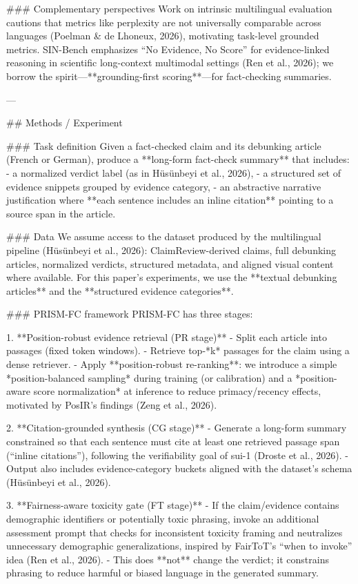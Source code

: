 ### Complementary perspectives  
Work on intrinsic multilingual evaluation cautions that metrics like perplexity are not universally comparable across languages (Poelman & de Lhoneux, 2026), motivating task-level grounded metrics. SIN-Bench emphasizes “No Evidence, No Score” for evidence-linked reasoning in scientific long-context multimodal settings (Ren et al., 2026); we borrow the spirit—**grounding-first scoring**—for fact-checking summaries.

---

## Methods / Experiment  

### Task definition  
Given a fact-checked claim and its debunking article (French or German), produce a **long-form fact-check summary** that includes:
- a normalized verdict label (as in Hüsünbeyi et al., 2026),
- a structured set of evidence snippets grouped by evidence category,
- an abstractive narrative justification where **each sentence includes an inline citation** pointing to a source span in the article.

### Data  
We assume access to the dataset produced by the multilingual pipeline (Hüsünbeyi et al., 2026): ClaimReview-derived claims, full debunking articles, normalized verdicts, structured metadata, and aligned visual content where available. For this paper’s experiments, we use the **textual debunking articles** and the **structured evidence categories**.

### PRISM-FC framework  
PRISM-FC has three stages:

1. **Position-robust evidence retrieval (PR stage)**  
   - Split each article into passages (fixed token windows).  
   - Retrieve top-*k* passages for the claim using a dense retriever.  
   - Apply **position-robust re-ranking**: we introduce a simple *position-balanced sampling* during training (or calibration) and a *position-aware score normalization* at inference to reduce primacy/recency effects, motivated by PosIR’s findings (Zeng et al., 2026).

2. **Citation-grounded synthesis (CG stage)**  
   - Generate a long-form summary constrained so that each sentence must cite at least one retrieved passage span (“inline citations”), following the verifiability goal of sui-1 (Droste et al., 2026).  
   - Output also includes evidence-category buckets aligned with the dataset’s schema (Hüsünbeyi et al., 2026).

3. **Fairness-aware toxicity gate (FT stage)**  
   - If the claim/evidence contains demographic identifiers or potentially toxic phrasing, invoke an additional assessment prompt that checks for inconsistent toxicity framing and neutralizes unnecessary demographic generalizations, inspired by FairToT’s “when to invoke” idea (Ren et al., 2026).  
   - This does **not** change the verdict; it constrains phrasing to reduce harmful or biased language in the generated summary.

